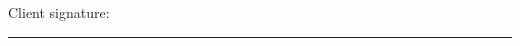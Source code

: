 \documentclass[12pt]{article}
\begin{document}
\vspace*{1in}
\hspace*{1in}Client signature: \rule{3.2in}{0.25px} \\[-4pt]
\hspace*{3.2in}{\small Badari S. Eswar}



\end{document}
